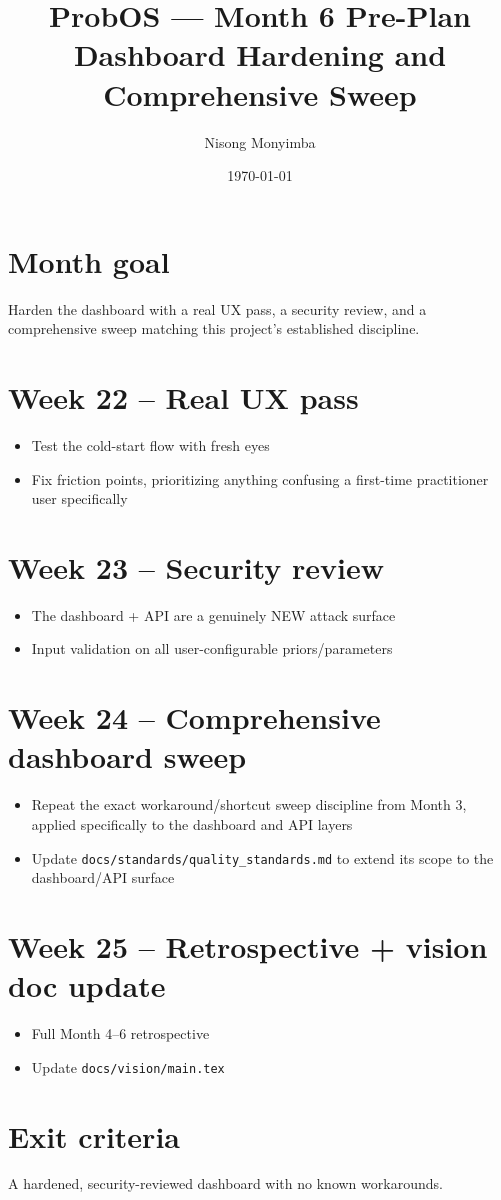 \documentclass[11pt]{article}
\title{ProbOS --- Month 6 Pre-Plan\\Dashboard Hardening and Comprehensive Sweep}
\author{Nisong Monyimba}
\date{\today}
\begin{document}
\maketitle

\section*{Month goal}
Harden the dashboard with a real UX pass, a security review, and a
comprehensive sweep matching this project's established discipline.

\section*{Week 22 -- Real UX pass}
\begin{itemize}[leftmargin=*]
  \item Test the cold-start flow with fresh eyes
  \item Fix friction points, prioritizing anything confusing a
    first-time practitioner user specifically
\end{itemize}

\section*{Week 23 -- Security review}
\begin{itemize}[leftmargin=*]
  \item The dashboard + API are a genuinely NEW attack surface
  \item Input validation on all user-configurable priors/parameters
\end{itemize}

\section*{Week 24 -- Comprehensive dashboard sweep}
\begin{itemize}[leftmargin=*]
  \item Repeat the exact workaround/shortcut sweep discipline from
    Month 3, applied specifically to the dashboard and API layers
  \item Update \texttt{docs/standards/quality\_standards.md} to
    extend its scope to the dashboard/API surface
\end{itemize}

\section*{Week 25 -- Retrospective + vision doc update}
\begin{itemize}[leftmargin=*]
  \item Full Month 4--6 retrospective
  \item Update \texttt{docs/vision/main.tex}
\end{itemize}

\section*{Exit criteria}
A hardened, security-reviewed dashboard with no known workarounds.
\end{document}
